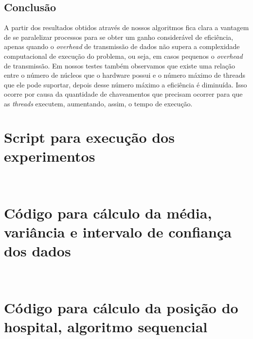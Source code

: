 \documentclass[11pt,twoside]{article}
\begin{document}
{{\section{Conclusão}

    A partir dos resultados obtidos através de nossos algoritmos fica clara a vantagem
    de se paralelizar processos para se obter um ganho considerável de eficiência, apenas
    quando o {\it overhead} de transmissão de dados não supera a complexidade computacional
    de execução do problema, ou seja, em casos pequenos o {\it overhead} de transmissão. Em
    nossos testes também observamos que existe uma relação entre o número de núcleos
    que o hardware possui e o número máximo de threads que ele pode suportar, depois
    desse número máximo a eficiência é diminuída. Isso ocorre por causa da quantidade
    de chaveamentos que precisam ocorrer para que as {\it threads} executem, aumentando,
    assim, o tempo de execução.

\clearpage

\begin{appendices}

    \chapter{Script para execução dos experimentos}
        

    \ \\

    \chapter{Código para cálculo da média, variância e intervalo de confiança dos dados}
        
    \ \\
        
    \chapter{Código para cálculo da posição do hospital, algoritmo sequencial}
        
        
    \ \\
        

\end{appendices}}}
\end{document}
